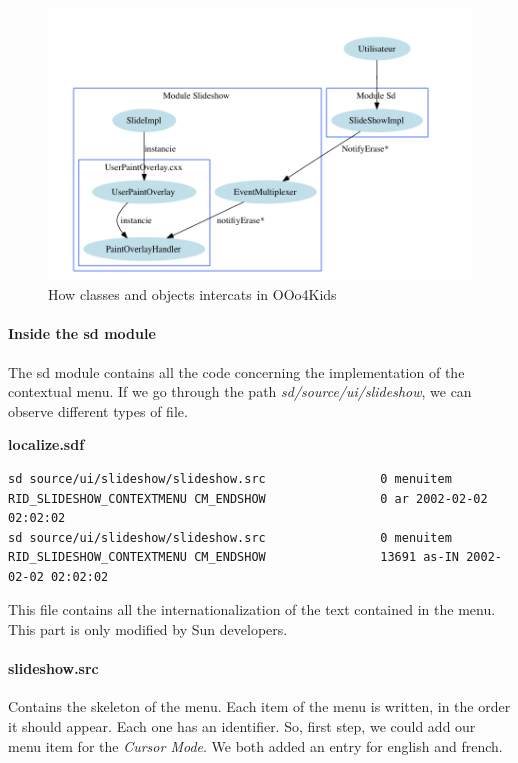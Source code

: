 \documentclass[a4paper,11pt]{article}
\begin{document}
\begin{figure}[!h]
\centering
\includegraphics[scale=0.5]{images/Slideshow_interaction.png}
\caption{How classes and objects intercats in OOo4Kids}
\end{figure}   

\paragraph*{Inside the sd module}
The sd module contains all the code concerning the implementation of the
contextual menu. If we go through the path \emph{sd/source/ui/slideshow}, we
can observe different types of file.

\textbf{localize.sdf}

\begin{verbatim}
sd source/ui/slideshow/slideshow.src                0 menuitem
RID_SLIDESHOW_CONTEXTMENU CM_ENDSHOW                0 ar 2002-02-02 02:02:02
sd source/ui/slideshow/slideshow.src                0 menuitem
RID_SLIDESHOW_CONTEXTMENU CM_ENDSHOW                13691 as-IN 2002-02-02 02:02:02
\end{verbatim}

This file contains all the internationalization of the text contained in the
menu. This part is only modified by Sun developers.

\paragraph*{slideshow.src} Contains the skeleton of the menu. Each item of the
menu is written, in the order it should appear. Each one has an identifier.
So, first step, we could add our menu item for the \emph{Cursor Mode}. We both
added an entry for english and french.
\end{document}
